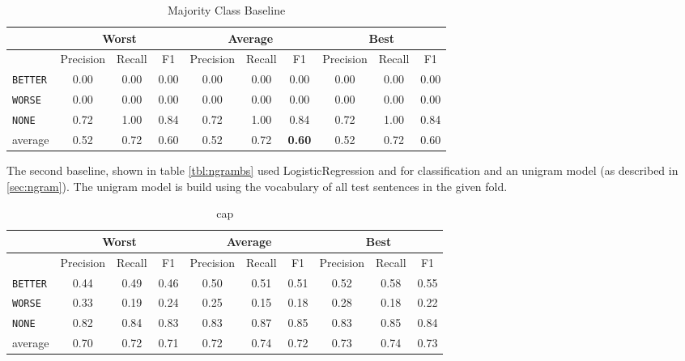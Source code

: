     \begin{table}[h]
\centering
\caption{ Majority Class Baseline }
\label{tbl:majority_class_baseline }
\begin{tabular}{@{}lccccccccc@{}}
\toprule
      & \multicolumn{3}{c}{Worst} & \multicolumn{3}{c}{Average} & \multicolumn{3}{c}{Best}  \\ \midrule
                 & Precision  & Recall & F1   & Precision  & Recall  & F1    & Precision & Recall & F1   \\ \toprule

    
\texttt{BETTER}	 & 0.00	 & 0.00	 & 0.00	 &0.00	 & 0.00	 & 0.00	 &0.00	 & 0.00	 & 0.00	 \\ 
\texttt{WORSE}	 & 0.00	 & 0.00	 & 0.00	 &0.00	 & 0.00	 & 0.00	 &0.00	 & 0.00	 & 0.00	 \\ 
\texttt{NONE}	 & 0.72	 & 1.00	 & 0.84	 &0.72	 & 1.00	 & 0.84	 &0.72	 & 1.00	 & 0.84	 \\ \midrule 
average	 & 0.52	 & 0.72	 & 0.60	 &0.52	 & 0.72	 & \textbf{0.60}	 &0.52	 & 0.72	 & 0.60	 \\ \bottomrule

    \end{tabular}
\end{table}


The second baseline, shown in table \ref{tbl:ngrambs} used LogisticRegression and for classification and an unigram model (as described in \ref{sec:ngram}). The unigram model is build using the vocabulary of all test sentences in the given fold.

    \begin{table}[h]
\centering
\caption{ cap }
\label{tbl:cap }
\begin{tabular}{@{}lccccccccc@{}}
\toprule
      & \multicolumn{3}{c}{Worst} & \multicolumn{3}{c}{Average} & \multicolumn{3}{c}{Best}  \\ \midrule
                 & Precision  & Recall & F1   & Precision  & Recall  & F1    & Precision & Recall & F1   \\ \toprule

    
\texttt{BETTER}	 & 0.44	 & 0.49	 & 0.46	 &0.50	 & 0.51	 & 0.51	 &0.52	 & 0.58	 & 0.55	 \\ 
\texttt{WORSE}	 & 0.33	 & 0.19	 & 0.24	 &0.25	 & 0.15	 & 0.18	 &0.28	 & 0.18	 & 0.22	 \\ 
\texttt{NONE}	 & 0.82	 & 0.84	 & 0.83	 &0.83	 & 0.87	 & 0.85	 &0.83	 & 0.85	 & 0.84	 \\ \midrule 
average	 & 0.70	 & 0.72	 & 0.71	 &0.72	 & 0.74	 & 0.72	 &0.73	 & 0.74	 & 0.73	 \\ \bottomrule

    \end{tabular}
\end{table}




